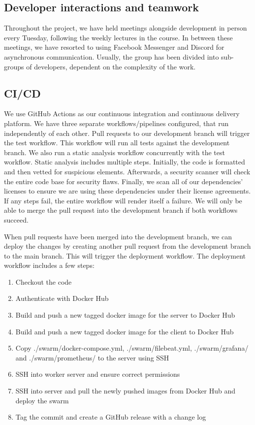 \documentclass{article}
\begin{document}
\subsection{Developer interactions and teamwork}


\noindent Throughout the project, we have held meetings alongside development in person every Tuesday, following the weekly lectures in the course. In between these meetings, we have resorted to using Facebook Messenger and Discord for asynchronous communication.
Usually, the group has been divided into sub-groups of developers, dependent on the complexity of the work.


\subsection{CI/CD}
We use GitHub Actions as our continuous integration and continuous delivery platform. We have three separate workflows/pipelines configured, that run independently of each other. Pull requests to our development branch will trigger the test workflow. This workflow will run all tests against the development branch. We also run a static analysis workflow concurrently with the test workflow. Static analysis includes multiple steps. Initially, the code is formatted and then vetted for suspicious elements. Afterwards, a security scanner will check the entire code base for security flaws. Finally, we scan all of our dependencies' licenses to ensure we are using these dependencies under their license agreements. If any steps fail, the entire workflow will render itself a failure. We will only be able to merge the pull request into the development branch if both workflows succeed.

When pull requests have been merged into the development branch, we can deploy the changes by creating another pull request from the development branch to the main branch. This will trigger the deployment workflow. The deployment workflow includes a few steps:
\begin{enumerate}
    \item Checkout the code
    \item Authenticate with Docker Hub
    \item Build and push a new tagged docker image for the server to Docker Hub
    \item Build and push a new tagged docker image for the client to Docker Hub
    \item Copy ./swarm/docker-compose.yml, ./swarm/filebeat.yml, ./swarm/grafana/ and ./swarm/prometheus/ to the server using SSH
    \item SSH into worker server and ensure correct permissions
    \item SSH into server and pull the newly pushed images from Docker Hub and deploy the swarm
    \item Tag the commit and create a GitHub release with a change log
\end{enumerate}
\end{document}

